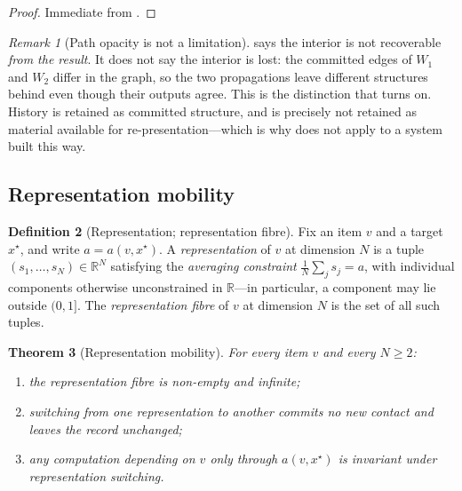 \documentclass[11pt,twocolumn,a4paper]{article}
\theoremstyle{dirthm}
\newtheorem{theorem}{Theorem}[section]
\theoremstyle{definition}
\newtheorem{definition}[theorem]{Definition}
\theoremstyle{remark}
\newtheorem{remark}[theorem]{Remark}
\newcommand{\R}{\mathbb{R}}
\newcommand{\al}{a}
\newcommand{\Walk}{W}
\begin{document}
\begin{proof}
Immediate from .
\end{proof}

\begin{remark}[Path opacity is not a limitation]
\label{rem:opacity-feature}
 says the interior is not recoverable \emph{from the
result}. It does not say the interior is lost: the committed edges of
$\Walk_1$ and $\Walk_2$ differ in the graph, so the two propagations leave
different structures behind even though their outputs agree. This is the
distinction that  turns on. History is retained as
committed structure, and is precisely not retained as material available for
re-presentation---which is why  does not apply to a
system built this way.
\end{remark}

\subsection{Representation mobility}

\begin{definition}[Representation; representation fibre]
\label{def:representation}
Fix an item $v$ and a target $x^{\star}$, and write $\al=\al(v,x^{\star})$. A
\emph{representation} of $v$ at dimension $N$ is a tuple
$(s_1,\dots,s_N)\in\R^{N}$ satisfying the \emph{averaging constraint}
$\frac1N\sum_j s_j=\al$, with individual components otherwise unconstrained
in $\R$---in particular, a component may lie outside $(0,1]$. The
\emph{representation fibre} of $v$ at dimension $N$ is the set of all such
tuples.
\end{definition}

\begin{theorem}[Representation mobility]
\label{thm:rep-mobility}
For every item $v$ and every $N\ge2$:
\begin{enumerate}[label=\textup{(\roman*)},leftmargin=2.0em,itemsep=1pt]
\item the representation fibre is non-empty and infinite;
\item switching from one representation to another commits no new contact and
leaves the record unchanged;
\item any computation depending on $v$ only through $\al(v,x^{\star})$ is
invariant under representation switching.
\end{enumerate}
\end{theorem}
\end{document}
